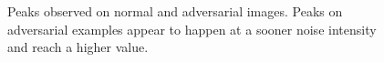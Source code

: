 \begin{figure}[htp]


    \caption{Peaks observed on normal and adversarial images. Peaks on
        adversarial examples appear to happen at a sooner noise intensity and
        reach a higher value.}
    \label{fig:peaks}
\end{figure}

